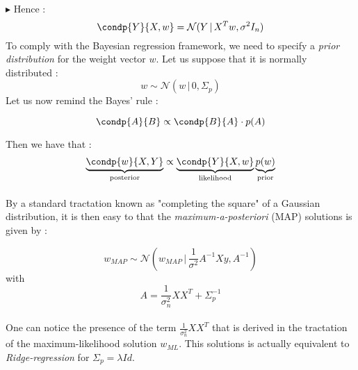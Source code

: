 \documentclass[a4paper]{article}
\begin{document}
{{			\paragraph{} $\blacktriangleright$ Hence : 
			\begin{equation}
				\condp{Y}{X,w} = \mathcal{N}(Y\, \vert \, X^Tw, \sigma^2I_n)
			\end{equation}
			To comply with the Bayesian regression framework, we need to specify a \emph{prior distribution} for the weight vector $w$. Let us suppose that it is normally distributed : 
			\begin{equation}
				w \sim \mathcal{N}(w \, \vert \, 0, \Sigma_p)
			\end{equation}
			Let us now remind the Bayes' rule : 
			\vspace{10pt}
			
			{
				$$\condp{A}{B} \propto \condp{B}{A} \cdot p(A)$$
			}
			
			\noindent Then we have that : 
			\begin{equation}
				\underbrace{\condp{w}{X,Y}}_{\text{posterior}} \propto \underbrace{\condp{Y}{X,w}}_{\text{likelihood}} \underbrace{p(w)}_{\text{prior}}
			\end{equation}
			
			\paragraph{} By a standard tractation known as "completing the square" of a Gaussian distribution, it is then easy to that the \emph{maximum-a-posteriori} (MAP) solutions is given by : 
			\vspace{10pt}
			
			{
				\begin{equation}
					w_{MAP} \sim \mathcal{N}(w_{MAP} \, \vert \, \frac{1}{\sigma^2}A^{-1}Xy, A^{-1})
				\end{equation}
				with 
				\begin{equation}
					A = \frac{1}{\sigma_n^2} XX^T + \Sigma_p^{-1}
				\end{equation}
			}
			
							
				\paragraph{} One can notice the presence of the term $\displaystyle\frac{1}{\sigma_n^2} XX^T$ that is derived in the tractation of the maximum-likelihood solution $w_{ML}$. This solutions is actually equivalent to \emph{Ridge-regression} for $\Sigma_p = \lambda Id$. 
		}
		
}
\end{document}
